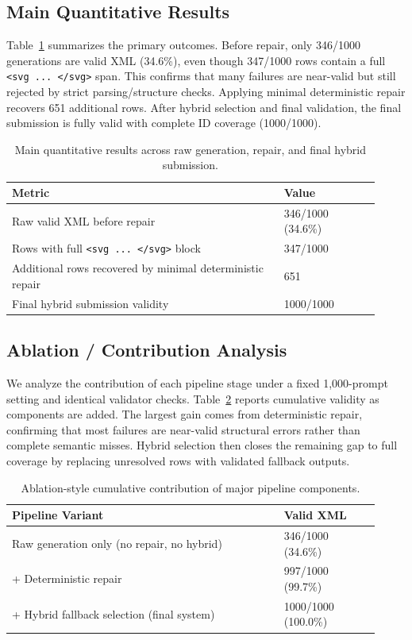 \documentclass[11pt]{article}
\begin{document}
\subsection{Main Quantitative Results}
Table~\ref{tab:main-results} summarizes the primary outcomes.
Before repair, only 346/1000 generations are valid XML (34.6\%), even though 347/1000 rows contain a full \texttt{<svg ... </svg>} span.
This confirms that many failures are near-valid but still rejected by strict parsing/structure checks.
Applying minimal deterministic repair recovers 651 additional rows.
After hybrid selection and final validation, the final submission is fully valid with complete ID coverage (1000/1000).

\begin{table}[!htbp]
    \centering
    \small
    \begin{tabular}{p{0.68\linewidth} p{0.24\linewidth}}
        \hline
        \textbf{Metric} & \textbf{Value} \\
        \hline
        Raw valid XML before repair & 346/1000 (34.6\%) \\
        Rows with full \texttt{<svg ... </svg>} block & 347/1000 \\
        Additional rows recovered by minimal deterministic repair & 651 \\
        Final hybrid submission validity & 1000/1000 \\
        \hline
    \end{tabular}
    \caption{Main quantitative results across raw generation, repair, and final hybrid submission.}
    \label{tab:main-results}
\end{table}

\subsection{Ablation / Contribution Analysis}
We analyze the contribution of each pipeline stage under a fixed 1,000-prompt setting and identical validator checks.
Table~\ref{tab:ablation-results} reports cumulative validity as components are added.
The largest gain comes from deterministic repair, confirming that most failures are near-valid structural errors rather than complete semantic misses.
Hybrid selection then closes the remaining gap to full coverage by replacing unresolved rows with validated fallback outputs.

\begin{table}[!htbp]
    \centering
    \small
    \begin{tabular}{p{0.68\linewidth} p{0.24\linewidth}}
        \hline
        \textbf{Pipeline Variant} & \textbf{Valid XML} \\
        \hline
        Raw generation only (no repair, no hybrid) & 346/1000 (34.6\%) \\
        + Deterministic repair & 997/1000 (99.7\%) \\
        + Hybrid fallback selection (final system) & 1000/1000 (100.0\%) \\
        \hline
    \end{tabular}
    \caption{Ablation-style cumulative contribution of major pipeline components.}
    \label{tab:ablation-results}
\end{table}
\end{document}
